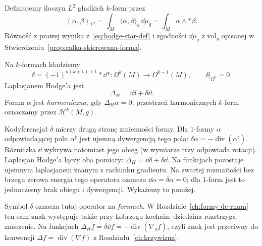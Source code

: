 Definiujemy iloczyn $L^2$ gładkich $k$-form przez
\begin{equation}\label{eq:hodge-l2}
 (\alpha,\beta)_{L^2}
 =\int_M\langle\alpha,\beta\rangle_g\,\dd\mu_g
 =\int_M\alpha\wedge*\beta.
\end{equation}
Równość z prawej wynika z~\eqref{eq:hodge-star-def}
i zgodności $\dd\mu_g$ z $\mathrm{vol}_g$ opisanej w
Stwierdzeniu~\ref{prop:calka-skierowana-forma}.

\begin{definicja}
\label{def:hodge-codifferential}
Na $k$-formach kładziemy
\begin{equation}\label{eq:hodge-delta}
 \delta=(-1)^{n(k+1)+1}*\dd*:\Omega^k(M)\longrightarrow
                                     \Omega^{k-1}(M),
 \qquad\delta|_{\Omega^0}=0.
\end{equation}
Laplasjanem Hodge'a jest
\begin{equation}\label{eq:hodge-laplacian}
 \Delta_H=\dd\delta+\delta\dd.
\end{equation}
Forma $\alpha$ jest \emph{harmoniczna}, gdy
$\Delta_H\alpha=0$; przestrzeń harmonicznych $k$-form
oznaczamy przez $\mathcal H^k(M,g)$.
\end{definicja}

Kodyferencjał $\delta$ mierzy drugą stronę zmienności
formy. Dla $1$-formy $\alpha$ odpowiadającej polu
$\alpha^\sharp$ jest ujemną dywergencją tego pola:
$\delta\alpha=-\operatorname{div}(\alpha^\sharp)$.
Różniczka $\dd$ wykrywa natomiast jego obieg
(w wymiarze trzy odpowiada rotacji). Laplasjan Hodge'a
łączy oba pomiary: $\Delta_H=\dd\delta+\delta\dd$.
Na funkcjach pozostaje ujemnym laplasjanem znanym z
rachunku gradientu. Na zwartej rozmaitości bez brzegu
zerowa energia tego operatora oznacza
$\dd\alpha=\delta\alpha=0$; dla $1$-form jest to
jednoczesny brak obiegu i dywergencji.
Wykażemy to poniżej.

Symbol $\delta$ oznacza tutaj operator na \emph{formach}.
W Rozdziale~\ref{ch:formy-de-rham} ten sam znak występuje
także przy kobrzegu kochain; dziedzina rozstrzyga znaczenie.
Na funkcjach $\Delta_H f=\delta\dd f=-\operatorname{div}
(\nabla_g f)$, czyli znak jest przeciwny do konwencji
$\Delta f=\operatorname{div}(\nabla f)$ z
Rozdziału~\ref{ch:krzywizna}.


